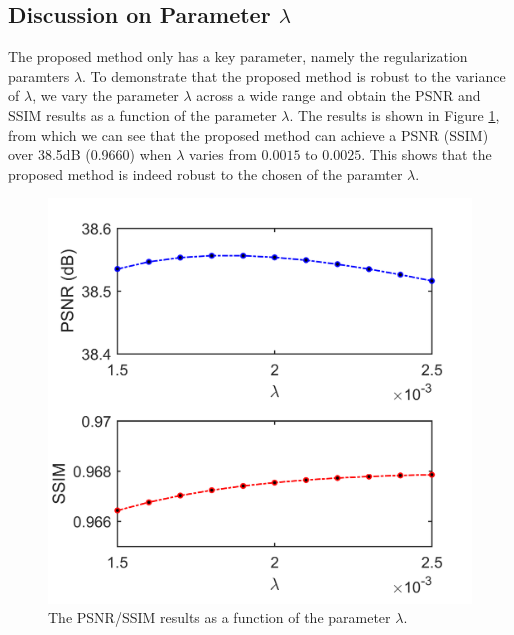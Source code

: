 \documentclass[10pt,twocolumn,letterpaper]{article}
\begin{document}
\subsection{Discussion on Parameter $\lambda$}
The proposed method only has a key parameter, namely the regularization paramters $\lambda$. To demonstrate that the proposed method is robust to the variance of $\lambda$, we vary the parameter $\lambda$ across a wide range and obtain the PSNR and SSIM results as a function of the parameter $\lambda$. The results is shown in Figure \ref{fig10}, from which we can see that the proposed method can achieve a PSNR (SSIM) over 38.5dB (0.9660) when $\lambda$ varies from $0.0015$ to $0.0025$. This shows that the proposed method is indeed robust to the chosen of the paramter $\lambda$.
\begin{figure}
\includegraphics[width=1\linewidth]{images/param.png}
\caption{The PSNR/SSIM results as a function of the parameter $\lambda$.}
\label{fig10}
\end{figure}
\end{document}
